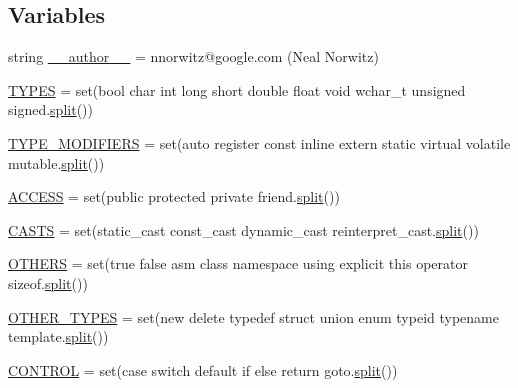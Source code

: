 \subsection*{Variables}
\begin{DoxyCompactItemize}
\item 
string \mbox{\hyperlink{namespacecpp_1_1keywords_a9fc334775aca87951ebdcd556dac21cc}{\+\_\+\+\_\+author\+\_\+\+\_\+}} = \textquotesingle{}nnorwitz@google.\+com (Neal Norwitz)\textquotesingle{}
\item 
\mbox{\hyperlink{namespacecpp_1_1keywords_a56fd5baf357970548e1ec366edfc2c13}{T\+Y\+P\+ES}} = set(\textquotesingle{}bool char int long short double float void wchar\+\_\+t unsigned signed\textquotesingle{}.\mbox{\hyperlink{_input_8h_aec2fd8cd9140a1b535dc54a924396f40}{split}}())
\item 
\mbox{\hyperlink{namespacecpp_1_1keywords_af9282ce418d6b4b43dca5ed574caedd7}{T\+Y\+P\+E\+\_\+\+M\+O\+D\+I\+F\+I\+E\+RS}} = set(\textquotesingle{}auto register const inline extern static virtual volatile mutable\textquotesingle{}.\mbox{\hyperlink{_input_8h_aec2fd8cd9140a1b535dc54a924396f40}{split}}())
\item 
\mbox{\hyperlink{namespacecpp_1_1keywords_a786f41bbea982641425c819d10bb2064}{A\+C\+C\+E\+SS}} = set(\textquotesingle{}public protected private friend\textquotesingle{}.\mbox{\hyperlink{_input_8h_aec2fd8cd9140a1b535dc54a924396f40}{split}}())
\item 
\mbox{\hyperlink{namespacecpp_1_1keywords_aeba38dc38e188040f4ec44ba05092e7f}{C\+A\+S\+TS}} = set(\textquotesingle{}static\+\_\+cast const\+\_\+cast dynamic\+\_\+cast reinterpret\+\_\+cast\textquotesingle{}.\mbox{\hyperlink{_input_8h_aec2fd8cd9140a1b535dc54a924396f40}{split}}())
\item 
\mbox{\hyperlink{namespacecpp_1_1keywords_a15fe231fbad145538b73892804898809}{O\+T\+H\+E\+RS}} = set(\textquotesingle{}true false asm class namespace using explicit this operator sizeof\textquotesingle{}.\mbox{\hyperlink{_input_8h_aec2fd8cd9140a1b535dc54a924396f40}{split}}())
\item 
\mbox{\hyperlink{namespacecpp_1_1keywords_aa86a5e35a3ace14022a5ca1b91baf207}{O\+T\+H\+E\+R\+\_\+\+T\+Y\+P\+ES}} = set(\textquotesingle{}new delete typedef struct union enum typeid typename template\textquotesingle{}.\mbox{\hyperlink{_input_8h_aec2fd8cd9140a1b535dc54a924396f40}{split}}())
\item 
\mbox{\hyperlink{namespacecpp_1_1keywords_a374dfe9c96681079802ba4724287b8ff}{C\+O\+N\+T\+R\+OL}} = set(\textquotesingle{}case switch default if else return goto\textquotesingle{}.\mbox{\hyperlink{_input_8h_aec2fd8cd9140a1b535dc54a924396f40}{split}}())

\end{DoxyCompactItemize}
